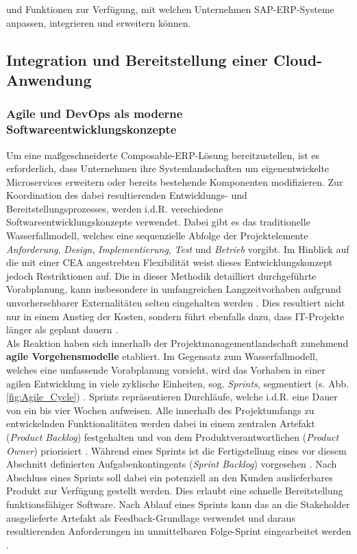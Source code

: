 und Funktionen zur Verfügung, mit welchen Unternehmen SAP-ERP-Systeme anpassen, integrieren und erweitern können. 

\subsection{Integration und Bereitstellung einer Cloud-Anwendung}
\subsubsection{Agile und DevOps als moderne Softwareentwicklungskonzepte}
Um eine maßgeschneiderte Composable-ERP-Lösung bereitzustellen, ist es erforderlich, dass Unternehmen ihre Systemlandschaften um eigenentwickelte Microservices erweitern oder bereits bestehende Komponenten modifizieren. Zur Koordination des dabei resultierenden Entwicklungs- und Bereitstellungsprozesses, werden i.d.R. verschiedene Softwareentwicklungskonzepte verwendet. Dabei gibt es das traditionelle Wasserfallmodell, welches eine sequenzielle Abfolge der Projektelemente \textit{Anforderung}, \textit{Design}, \textit{Implementierung}, \textit{Test} und \textit{Betrieb} vorgibt. Im Hinblick auf die mit einer CEA angestrebten Flexibilität weist dieses Entwicklungskonzept jedoch Restriktionen auf. Die in dieser Methodik detailliert durchgeführte Vorabplanung, kann insbesondere in umfangreichen Langzeitvorhaben aufgrund unvorhersehbarer Externalitäten selten eingehalten werden \cite[5]{Vivenzio.2013}. Dies resultiert nicht nur in einem Anstieg der Kosten, sondern führt ebenfalls dazu, dass IT-Projekte länger als geplant dauern \cite[41]{Vieweg.2015}.\\ Als Reaktion haben sich innerhalb der Projektmanagementlandschaft zunehmend \textbf{agile Vorgehensmodelle} etabliert.
Im Gegensatz zum Wasserfallmodell, welches eine umfassende Vorabplanung vorsieht, wird das Vorhaben in einer agilen Entwicklung in viele zyklische Einheiten, sog. \textit{Sprints}, segmentiert (s. Abb. \ref{fig:Agile_Cycle}) \cite[87]{Goll.2015}. Sprints repräsentieren Durchläufe, welche i.d.R. eine Dauer von ein bis vier Wochen aufweisen. Alle innerhalb des Projektumfangs zu entwickelnden Funktionalitäten werden dabei in einem zentralen Artefakt (\textit{Product Backlog}) festgehalten und von dem Produktverantwortlichen (\textit{Product Owner}) priorisiert \cite[196]{Gloger.2010}. Während eines Sprints ist die Fertigstellung eines vor diesem Abschnitt definierten Aufgabenkontingents (\textit{Sprint Backlog}) vorgesehen \cite[194]{.2013}. Nach Abschluss eines Sprints soll dabei ein potenziell an den Kunden auslieferbares Produkt zur Verfügung gestellt werden. Dies erlaubt eine schnelle Bereitstellung funktionsfähiger Software. Nach Ablauf eines Sprints kann das an die Stakeholder ausgelieferte Artefakt als Feedback-Grundlage verwendet und daraus resultierenden Anforderungen im unmittelbaren Folge-Sprint eingearbeitet werden \cite[S. 180 ff.]{Gloger.2016b}.
